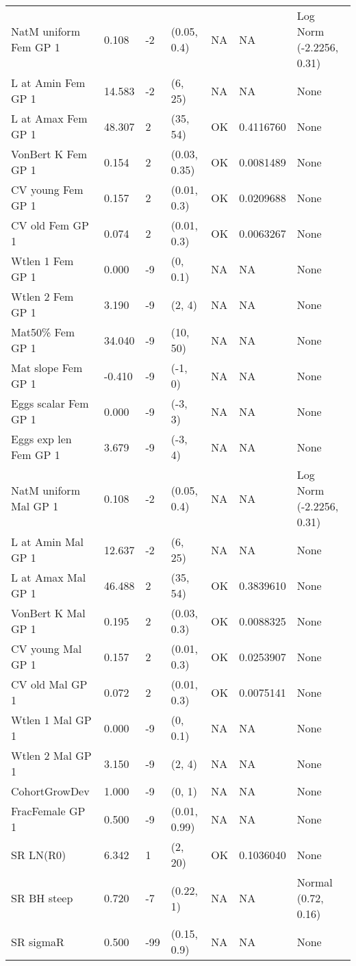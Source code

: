 \documentclass[11pt,
  english,
  letterpaper,
]{article}
\begin{document}
\begin{landscape}
\begin{longtable}[t]{>{\raggedright\arraybackslash}p{7cm}lllll>{\raggedright\arraybackslash}p{4cm}}
\endfoot
\bottomrule
\endlastfoot
NatM uniform Fem GP 1 & 0.108 & -2 & (0.05, 0.4) & NA & NA & Log Norm (-2.2256, 0.31)\\
L at Amin Fem GP 1 & 14.583 & -2 & (6, 25) & NA & NA & None\\
L at Amax Fem GP 1 & 48.307 & 2 & (35, 54) & OK & 0.4116760 & None\\
VonBert K Fem GP 1 & 0.154 & 2 & (0.03, 0.35) & OK & 0.0081489 & None\\
CV young Fem GP 1 & 0.157 & 2 & (0.01, 0.3) & OK & 0.0209688 & None\\
CV old Fem GP 1 & 0.074 & 2 & (0.01, 0.3) & OK & 0.0063267 & None\\
Wtlen 1 Fem GP 1 & 0.000 & -9 & (0, 0.1) & NA & NA & None\\
Wtlen 2 Fem GP 1 & 3.190 & -9 & (2, 4) & NA & NA & None\\
Mat50\% Fem GP 1 & 34.040 & -9 & (10, 50) & NA & NA & None\\
Mat slope Fem GP 1 & -0.410 & -9 & (-1, 0) & NA & NA & None\\
Eggs scalar Fem GP 1 & 0.000 & -9 & (-3, 3) & NA & NA & None\\
Eggs exp len Fem GP 1 & 3.679 & -9 & (-3, 4) & NA & NA & None\\
NatM uniform Mal GP 1 & 0.108 & -2 & (0.05, 0.4) & NA & NA & Log Norm (-2.2256, 0.31)\\
L at Amin Mal GP 1 & 12.637 & -2 & (6, 25) & NA & NA & None\\
L at Amax Mal GP 1 & 46.488 & 2 & (35, 54) & OK & 0.3839610 & None\\
VonBert K Mal GP 1 & 0.195 & 2 & (0.03, 0.3) & OK & 0.0088325 & None\\
CV young Mal GP 1 & 0.157 & 2 & (0.01, 0.3) & OK & 0.0253907 & None\\
CV old Mal GP 1 & 0.072 & 2 & (0.01, 0.3) & OK & 0.0075141 & None\\
Wtlen 1 Mal GP 1 & 0.000 & -9 & (0, 0.1) & NA & NA & None\\
Wtlen 2 Mal GP 1 & 3.150 & -9 & (2, 4) & NA & NA & None\\
CohortGrowDev & 1.000 & -9 & (0, 1) & NA & NA & None\\
FracFemale GP 1 & 0.500 & -9 & (0.01, 0.99) & NA & NA & None\\
SR LN(R0) & 6.342 & 1 & (2, 20) & OK & 0.1036040 & None\\
SR BH steep & 0.720 & -7 & (0.22, 1) & NA & NA & Normal (0.72, 0.16)\\
SR sigmaR & 0.500 & -99 & (0.15, 0.9) & NA & NA & None\\

\end{longtable}
\end{landscape}
\end{document}
